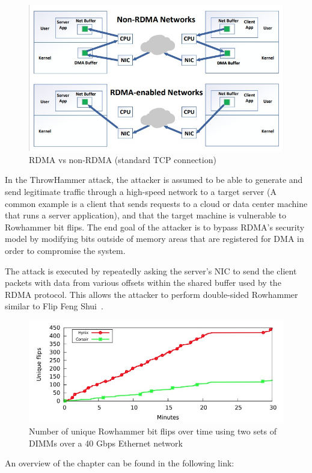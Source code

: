 \begin{figure}[!ht]
	\centering
	\includegraphics[width=0.8\linewidth]{images/chapter_9/RDMA.jpeg}
	\caption{RDMA vs non-RDMA (standard TCP connection)}
	\label{fig:RDMA_vs_non-RDMA}
\end{figure}

In the ThrowHammer attack, the attacker is assumed to be able to generate and send legitimate
traffic through a high-speed network to a target server (A common example is a client that sends requests to a cloud or data center machine that runs a server application), and that the target machine is vulnerable to Rowhammer bit flips.
The end goal of the attacker is to bypass RDMA’s security model by modifying bits outside of memory areas that are registered for DMA in order to compromise the system.

The attack is executed by repeatedly asking the server’s NIC to send the client packets with data from various offsets within the shared buffer used by the RDMA protocol. This allows the attacker to perform double-sided Rowhammer similar to Flip Feng Shui~\cite{ffs}.

\begin{figure}[!ht]
	\centering
	\includegraphics[width=0.75\linewidth]{images/chapter_9/Unique-Flips.jpeg}
	\caption{Number of unique Rowhammer bit flips over time using two sets of DIMMs over a 40 Gbps Ethernet network ~\cite{throwhammer}}
	\label{fig:Unique-Flips}
\end{figure}

An overview of the chapter can be found in the following link: \cite{chapter9-overview}


